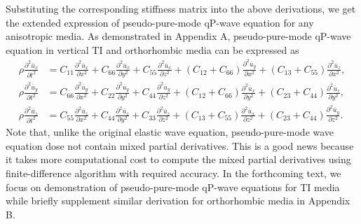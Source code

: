 Substituting the corresponding stiffness matrix into the above derivations, we get the extended expression of
pseudo-pure-mode qP-wave equation for any anisotropic media.
As demonstrated in Appendix A, pseudo-pure-mode qP-wave equation in vertical TI and orthorhombic media can be expressed as
\begin{equation}
\label{eq:pseudo}
\begin{split}
\rho\frac{\partial^2\overline{u}_x}{\partial t^2} &= C_{11}\frac{\partial^2{\overline{u}_x}}{\partial x^2}
                                                  + C_{66}\frac{\partial^2{\overline{u}_x}}{\partial y^2}
                                                  + C_{55}\frac{\partial^2{\overline{u}_x}}{\partial z^2}
                                                  +(C_{12}+C_{66})\frac{\partial^2{\overline{u}_y}}{\partial x^2}
                                                  +(C_{13}+C_{55})\frac{\partial^2{\overline{u}_z}}{\partial x^2}, \\
\rho\frac{\partial^2\overline{u}_y}{\partial t^2} &= C_{66}\frac{\partial^2{\overline{u}_y}}{\partial x^2}
                                                  + C_{22}\frac{\partial^2{\overline{u}_y}}{\partial y^2}
                                                  + C_{44}\frac{\partial^2{\overline{u}_y}}{\partial z^2}
                                                  +(C_{12}+C_{66})\frac{\partial^2{\overline{u}_x}}{\partial y^2}
                                                  +(C_{23}+C_{44})\frac{\partial^2{\overline{u}_z}}{\partial y^2}, \\
\rho\frac{\partial^2\overline{u}_z}{\partial t^2} &= C_{55}\frac{\partial^2{\overline{u}_z}}{\partial x^2}
                                                  + C_{44}\frac{\partial^2{\overline{u}_z}}{\partial y^2}
                                                  + C_{33}\frac{\partial^2{\overline{u}_z}}{\partial z^2}
                                                  +(C_{13}+C_{55})\frac{\partial^2{\overline{u}_x}}{\partial z^2}
                                                  +(C_{23}+C_{44})\frac{\partial^2{\overline{u}_y}}{\partial z^2}.
\end{split}
\end{equation}
Note that, unlike the original elastic wave equation, pseudo-pure-mode wave equation dose not contain mixed partial
derivatives.
This is a good news because it takes more computational cost to compute the mixed partial derivatives
using  finite-difference algorithm with required accuracy.
In the forthcoming text, we focus on demonstration of pseudo-pure-mode qP-wave equations for TI media while
briefly supplement similar derivation for orthorhombic media in Appendix B.

